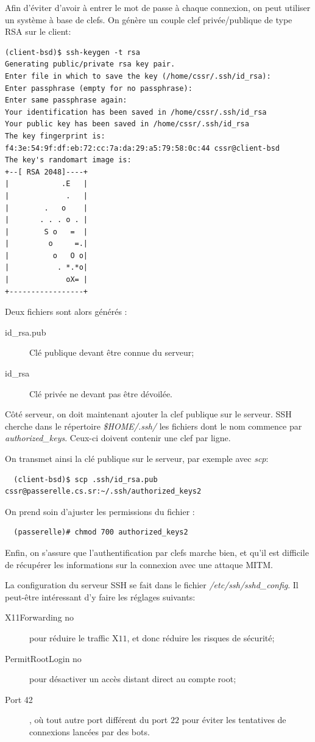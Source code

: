 \documentclass[a4paper]{article}
\begin{document}
Afin d'éviter d'avoir à entrer le mot de passe à chaque connexion, on peut
utiliser un système à base de clefs. On génère un couple clef privée/publique
de type RSA sur le client:
\begin{verbatim}
(client-bsd)$ ssh-keygen -t rsa
Generating public/private rsa key pair.
Enter file in which to save the key (/home/cssr/.ssh/id_rsa): 
Enter passphrase (empty for no passphrase): 
Enter same passphrase again: 
Your identification has been saved in /home/cssr/.ssh/id_rsa
Your public key has been saved in /home/cssr/.ssh/id_rsa
The key fingerprint is:
f4:3e:54:9f:df:eb:72:cc:7a:da:29:a5:79:58:0c:44 cssr@client-bsd
The key's randomart image is:
+--[ RSA 2048]----+
|            .E   |
|             .   |
|        .   o    |
|       . . . o . |
|        S o   =  |
|         o     =.|
|          o   O o|
|           . *.*o|
|             oX= |
+-----------------+
\end{verbatim}

Deux fichiers sont alors générés :
\begin{description}
	\item[id\_rsa.pub]	Clé publique devant être connue du serveur;
	\item[id\_rsa] 		Clé privée ne devant pas être dévoilée.
\end{description}

Côté serveur, on doit maintenant ajouter la clef publique sur le
serveur. SSH cherche dans le répertoire \textit{\$HOME/.ssh/} les
fichiers dont le nom commence par \textit{authorized\_keys}. Ceux-ci
doivent contenir une clef par ligne.

On transmet ainsi la clé publique sur le serveur, par exemple avec
\textit{scp}:
\begin{verbatim}
  (client-bsd)$ scp .ssh/id_rsa.pub cssr@passerelle.cs.sr:~/.ssh/authorized_keys2
\end{verbatim}

On prend soin d'ajuster les permissions du fichier :
\begin{verbatim}
  (passerelle)# chmod 700 authorized_keys2
\end{verbatim}
 
Enfin, on s'assure que l'authentification par clefs marche bien, et
qu'il est difficile de récupérer les informations sur la connexion
avec une attaque MITM.

La configuration du serveur SSH se fait dans le fichier \textit{/etc/ssh/sshd\_config}.
Il peut-être intéressant d'y faire les réglages suivants:
\begin{description}
	\item[X11Forwarding no] pour réduire le traffic X$11$, et donc réduire les
	risques de sécurité;
	\item[PermitRootLogin no] pour désactiver un accès distant direct au compte
	root;
	\item[Port 42], où tout autre port différent du port $22$ pour éviter les
	tentatives de connexions lancées par des bots.
\end{description}
\end{document}
